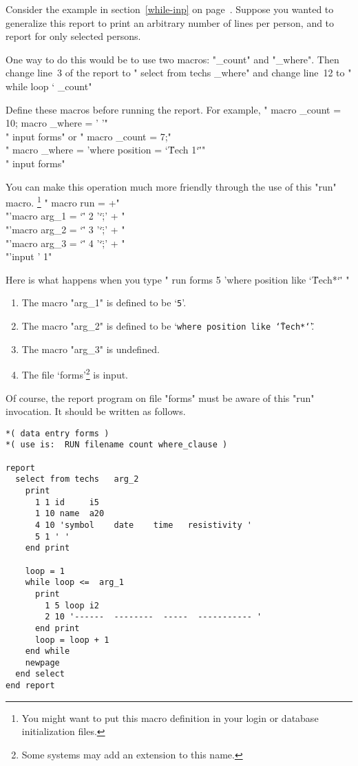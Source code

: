 \documentclass[11pt,a4paper]{report}
\begin{document}
Consider the example in section~\ref{while-inp}
on page~\pageref{while-inp}.
Suppose you wanted to generalize this report to print
an arbitrary number of lines per person, and
to report for only selected persons.
 
One way to do this would be to use
two macros: "\_count" and "\_where".
Then
change line~3 of the report to
" select from techs \_where"
and change line~12 to
" while loop \char` \_count"
 
Define these macros before running the report.
For example,
" macro \_count = 10; macro \_where = ' '"\\
  " input forms"
or
" macro \_count = 7;"\\
  " macro \_where = 'where position = \char`\"Tech 1\char`\"'"\\
  " input forms"
 
\medskip
 
You can make this operation much more friendly through the use
of this "run" macro.%
\footnote{You might want to put this macro definition in your
  login or database initialization files.}
" macro run = +"\\
  "\qquad 'macro arg\_1 = \char`\"' 2 '\char`\";' + "\\
  "\qquad 'macro arg\_2 = \char`\"' 3 '\char`\";' + "\\
  "\qquad 'macro arg\_3 = \char`\"' 4 '\char`\";' + "\\
  "\qquad 'input ' 1"
 
Here is what happens when you type
" run forms 5 'where position like \char`\"Tech*\char`\"' "
\begin{enumerate}
\item The macro "arg\_1" is defined to be `{\tt5}'.
\item The macro "arg\_2" is defined to be
      `{\tt where position like \char`\"Tech*\char`\"}'.
\item The macro "arg\_3" is undefined.
\item The file `forms'\footnote{Some systems may add an
extension to this name.} is input.
 
\end{enumerate}
 
Of course, the report program on file "forms" must be aware of
this "run" invocation.  It should be written as follows.
 
\demobreak
\begin{verbatim}
*( data entry forms )
*( use is:  RUN filename count where_clause )
 
report
  select from techs   arg_2
    print
      1 1 id     i5
      1 10 name  a20
      4 10 'symbol    date    time   resistivity '
      5 1 ' '
    end print
 
    loop = 1
    while loop <=  arg_1
      print
        1 5 loop i2
        2 10 '------  --------  -----  ----------- '
      end print
      loop = loop + 1
    end while
    newpage
  end select
end report
\end{verbatim}
 
\end{document}
